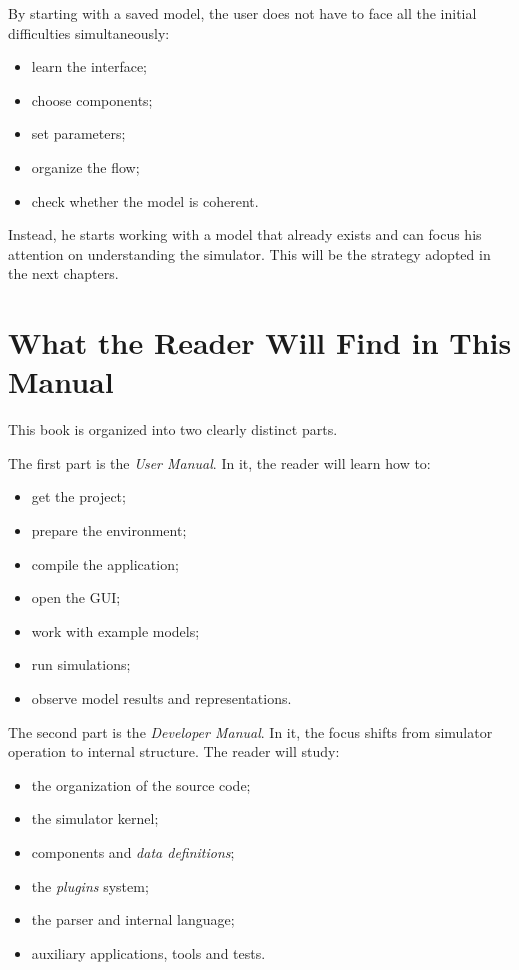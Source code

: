 By starting with a saved model, the user does not have to face all the initial difficulties simultaneously:
\begin{itemize}
\item learn the interface;
\item choose components;
\item set parameters;
\item organize the flow;
\item check whether the model is coherent.
\end{itemize}

Instead, he starts working with a model that already exists and can focus his attention on understanding the simulator. This will be the strategy adopted in the next chapters.

\section{What the Reader Will Find in This Manual}
\label{sec:cap1_o_que_o_leitor_encontrara}

This book is organized into two clearly distinct parts.

The first part is the \textit{User Manual}. In it, the reader will learn how to:
\begin{itemize}
\item get the project;
\item prepare the environment;
\item compile the application;
\item open the GUI;
\item work with example models;
\item run simulations;
\item observe model results and representations.
\end{itemize}

The second part is the \textit{Developer Manual}. In it, the focus shifts from simulator operation to internal structure. The reader will study:
\begin{itemize}
\item the organization of the source code;
\item the simulator kernel;
\item components and \textit{data definitions};
\item the \textit{plugins} system;
\item the parser and internal language;
\item auxiliary applications, tools and tests.
\end{itemize}

